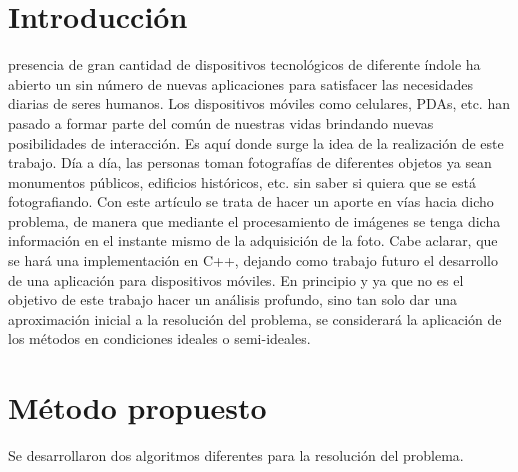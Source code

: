 \documentclass[conference,spanish,a4paper,10pt,oneside,final]{tfmpd}
\begin{document}
\section{Introducción}
 presencia de gran cantidad de dispositivos tecnológicos de diferente índole ha abierto un sin número de nuevas aplicaciones para satisfacer las necesidades diarias de seres humanos. Los dispositivos móviles como celulares, PDAs, etc. han pasado a formar parte del común de nuestras vidas brindando nuevas posibilidades de interacción. Es aquí donde surge la idea de la realización de este trabajo. 
Día a día, las personas toman fotografías de diferentes objetos ya sean monumentos públicos, edificios históricos, etc. sin saber si quiera que se está fotografiando. Con este artículo se trata de hacer un aporte en vías hacia dicho problema, de manera que mediante el procesamiento de imágenes se tenga dicha información en el instante mismo de la adquisición de la foto. Cabe aclarar, que se hará una implementación en C++, dejando como trabajo futuro el desarrollo de una aplicación para dispositivos móviles.
En principio y ya que no es el objetivo de este trabajo hacer un análisis profundo, sino tan solo dar una aproximación inicial a la resolución del problema, se considerará la aplicación de los métodos en condiciones ideales o semi-ideales. 
%
%
%
%
\section{Método propuesto}
Se desarrollaron dos algoritmos diferentes para la resolución del problema.
\end{document}
